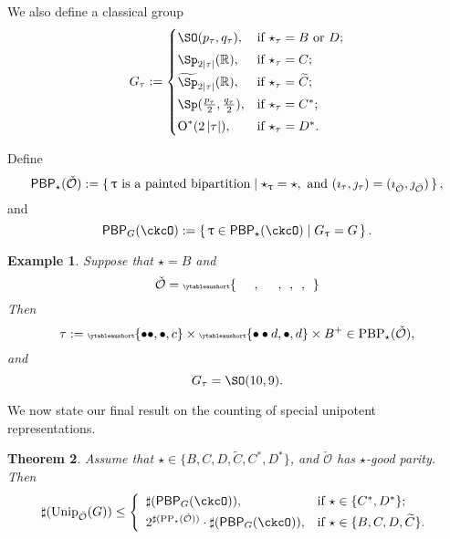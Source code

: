 \documentclass[12pt,a4paper]{amsart}
\let\ytb=\ytableaushort
\newcommand{\tytb}[1]{{\tiny\ytb{#1}}}
\def\abs#1{\left|{#1}\right|}
\newcommand{\CO}{{\mathcal {O}}}
\newcommand{\oO}{\operatorname{O}}
\newcommand{\R}{\mathbb R}
\numberwithin{equation}{section}
\newtheorem{thm}{Theorem}[section]
\newtheorem{eg}[thm]{Example}
\theoremstyle{remark}
\def\Unip{\mathrm{Unip}}
\def\CPPs{\mathrm{PP}_{\star}}
\def\PBP{\mathsf{PBP}}
\begin{document}
We also define a classical group
\begin{equation*}%
  G_\tau:=
  \begin{cases}
    \SO(p_\tau, q_\tau), &\hbox{if $\star_\tau=B$ or $D$}; \smallskip\\
    \Sp_{2\abs{\tau}}(\R), &\hbox{if $\star_\tau=C$}; \smallskip\\
    \widetilde{\Sp}_{2\abs{\tau}}(\R), &\hbox{if $\star_\tau=\widetilde{ C}$}; \smallskip \\
    \Sp(\frac{p_\tau}{2}, \frac{q_\tau}{2}), &\hbox{if $\star_\tau=C^*$}; \smallskip \\
    \oO^*(2\abs{\tau}), &\hbox{if $\star_\tau=D^*$}.\\
  \end{cases}
\end{equation*}


Define
\begin{equation*}%
  \PBP_\star(\check \CO) :=\set{ \uptau\textrm{ is a painted
      bipartition} \mid \star_\uptau = \star, \text{ and
    } (\imath_\tau,\jmath_\tau) = (\imath_{\check \CO}, \jmath_{\check \CO})},
\end{equation*}
and
\begin{equation*} %
    \PBP_{G}(\ckcO) :=\set{\uptau\in \PBP_{\star}(\ckcO)| G_{\uptau} = G}.
\end{equation*}

\delete{
  \[
    \begin{array}{rl}
      \mathrm{PBP}_\star(\check \CO):=\{ &
                                           \tau\textrm{ is a painted bipartition}  \mid    \star_\tau = \star,
                                           \text{ and } \\  & (\imath_\tau,\jmath_\tau) = (\imath_{\check \CO}, \jmath_{\check \CO})\}.
    \end{array}
  \]
}


\begin{eg} Suppose that $\star=B$ and
  \[
    \check \CO =\tytb{\ \ \ \ \ \ , \ \ \ \ \ \ , \ \ , \ \ , \ \ }
  \]
  Then
  \[
    \tau:= \tytb{\bullet \bullet ,\bullet , c } \times \tytb{\bullet \bullet d ,\bullet , d }\times B^+\in \mathrm{PBP}_{\star}(\check \CO),
  \]
  and
  \[
    G_\tau=\SO(10,9).
  \]
\end{eg}


We now state our final result on the counting of special unipotent representations.


\begin{thm}\label{countup}
  Assume that $\star\in \{B, C,D,\widetilde {C}, C^*, D^*\}$, and $\check \CO$ has $\star$-good parity. Then
 \[
   \sharp(\Unip_{\check \CO}(G)) \leq
    \left\{
    \begin{array}{ll}
       \sharp (\PBP_{G}(\ckcO)),  & \hbox{if $\star\in \{C^*,D^*\}$}; \smallskip\\
       2^{\sharp(\CPPs(\check \CO))} \cdot \sharp (\PBP_{G}(\ckcO)),  &\hbox{if $\star\in \{B, C,D,\widetilde {C}\}$}.
    \end{array}
  \right.
  \]
\end{thm}
\end{document}

